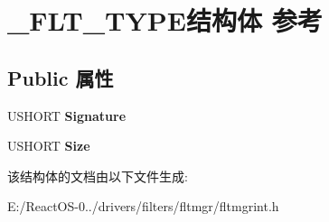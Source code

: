 \hypertarget{struct___f_l_t___t_y_p_e}{}\section{\+\_\+\+F\+L\+T\+\_\+\+T\+Y\+P\+E结构体 参考}
\label{struct___f_l_t___t_y_p_e}
\subsection*{Public 属性}
\begin{DoxyCompactItemize}
\item 
\mbox{\label{struct___f_l_t___t_y_p_e_a169515ff96fd6922cfbd5697777258a9}} 
U\+S\+H\+O\+RT {\bfseries Signature}
\item 
\mbox{\label{struct___f_l_t___t_y_p_e_a44dd16986481033c8db49d41909d0626}} 
U\+S\+H\+O\+RT {\bfseries Size}
\end{DoxyCompactItemize}


该结构体的文档由以下文件生成\+:\begin{DoxyCompactItemize}
\item 
E\+:/\+React\+O\+S-\/0../drivers/filters/fltmgr/fltmgrint.\+h\end{DoxyCompactItemize}
